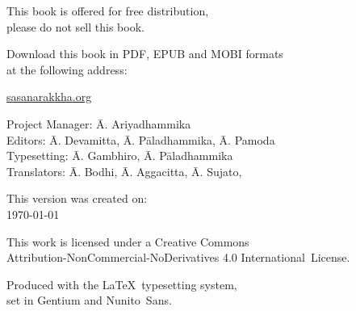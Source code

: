 \cleartoverso
\thispagestyle{empty}

\vspace*{-\baselineskip}

{%

\fontsize{9}{11}\selectfont
\centering
\setlength{\parindent}{0pt}%
\setlength{\parskip}{0.8\baselineskip}%


This book is offered for free distribution,\\
please do not sell this book.

Download this book in PDF, EPUB and MOBI formats\\
at the following address:

\href{https://sasanarakkha.org/}{sasanarakkha.org}

\vfill

Project Manager: Ā. Ariyadhammika\\
Editors: Ā. Devamitta, Ā. Pāladhammika, Ā. Pamoda\\
Typesetting: Ā. Gambhiro, Ā. Pāladhammika\\
Translators: Ā. Bodhi, Ā. Aggacitta, Ā. Sujato,

\vfill

This version was created on:\\
\today

\vfill

This work is licensed under a Creative Commons\\
Attribution-NonCommercial-NoDerivatives 4.0 International~License.

Produced with the \LaTeX\ typesetting system,\\
set in Gentium and Nunito~Sans.

\theEditionInfo

}
